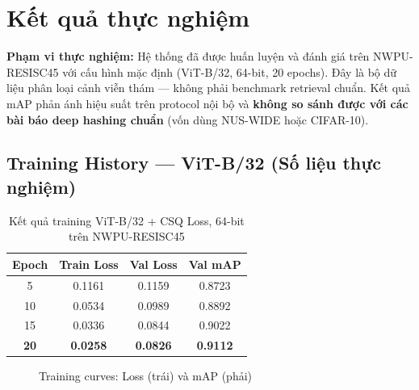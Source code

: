 \documentclass[13pt,a4paper]{article}
\begin{document}
\section{Kết quả thực nghiệm}

\textbf{Phạm vi thực nghiệm:} Hệ thống đã được huấn luyện và đánh giá trên NWPU-RESISC45 với cấu hình mặc định (ViT-B/32, 64-bit, 20 epochs). Đây là bộ dữ liệu phân loại cảnh viễn thám --- không phải benchmark retrieval chuẩn. Kết quả mAP phản ánh hiệu suất trên protocol nội bộ và \textbf{không so sánh được với các bài báo deep hashing chuẩn} (vốn dùng NUS-WIDE hoặc CIFAR-10).

\subsection{Training History --- ViT-B/32 (Số liệu thực nghiệm)}

\begin{table}[H]
\centering
\caption{Kết quả training ViT-B/32 + CSQ Loss, 64-bit trên NWPU-RESISC45}
\label{tab:training_history}
\begin{tabular}{cccc}
\toprule
\textbf{Epoch} & \textbf{Train Loss} & \textbf{Val Loss} & \textbf{Val mAP} \\
\midrule
5   & 0.1161 & 0.1159 & 0.8723 \\
10  & 0.0534 & 0.0989 & 0.8892 \\
15  & 0.0336 & 0.0844 & 0.9022 \\
\textbf{20} & \textbf{0.0258} & \textbf{0.0826} & \textbf{0.9112} \\
\bottomrule
\end{tabular}
\end{table}

\begin{figure}[H]
\centering
{}%
\hfill
{}
\caption{Training curves: Loss (trái) và mAP (phải)}
\label{fig:training_curves}
\end{figure}
\end{document}
